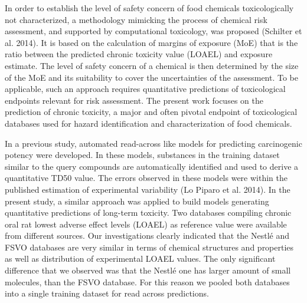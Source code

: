 \documentclass[]{achemso}
\begin{document}
In order to establish the level of safety concern of food chemicals
toxicologically not characterized, a methodology mimicking the process
of chemical risk assessment, and supported by computational toxicology,
was proposed (Schilter et al. 2014). It is based on the calculation of
margins of exposure (MoE) that is the ratio between the predicted
chronic toxicity value (LOAEL) and exposure estimate. The level of
safety concern of a chemical is then determined by the size of the MoE
and its suitability to cover the uncertainties of the assessment. To be
applicable, such an approach requires quantitative predictions of
toxicological endpoints relevant for risk assessment. The present work
focuses on the prediction of chronic toxicity, a major and often pivotal
endpoint of toxicological databases used for hazard identification and
characterization of food chemicals.

In a previous study, automated read-across like models for predicting
carcinogenic potency were developed. In these models, substances in the
training dataset similar to the query compounds are automatically
identified and used to derive a quantitative TD50 value. The errors
observed in these models were within the published estimation of
experimental variability (Lo Piparo et al. 2014). In the present study,
a similar approach was applied to build models generating quantitative
predictions of long-term toxicity. Two databases compiling chronic oral
rat lowest adverse effect levels (LOAEL) as reference value were
available from different sources. Our investigations clearly indicated
that the Nestlé and FSVO databases are very similar in terms of chemical
structures and properties as well as distribution of experimental LOAEL
values. The only significant difference that we observed was that the
Nestlé one has larger amount of small molecules, than the FSVO database.
For this reason we pooled both databases into a single training dataset
for read across predictions.
\end{document}
